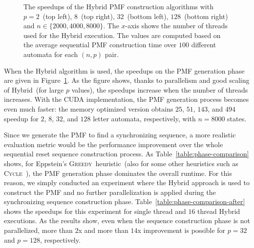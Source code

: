 \documentclass[12pt]{article}
\newcommand{\kkcomm}[1]{{\color{red}{\bf kk: #1}}}
\newcommand{\greedyAlgo}{\textsc{Greedy}}
\begin{document}
\begin{figure}[ht]
{	}
	\caption{The speedups of the Hybrid PMF construction algorithms with $p = 2$~(top left), $8$~(top right), $32$~(bottom left), $128$~(bottom right) and $n \in \{2000, 4000, 8000\}$. The $x$-axis shows the number of threads used for the Hybrid execution.  The values are computed based on the average sequential PMF construction time over $100$ different automata for each $(n, p)$ pair.\kkcomm{bu figureleri acalim yatay olarak, rakamlar sigmamis. ya da iki haneli speeduplar elde edelim bundan sonra... cok speedup olunca basa bela oluyor boyle.}}
	\label{fig:hybrid-speedup}
\end{figure}

When the Hybrid algorithm is used, the speedups on the PMF generation phase are given in Figure~\ref{fig:hybrid-speedup}. As the figure shows, thanks to parallelism and good scaling of Hybrid~(for large $p$ values), the speedups increase when the number of threads increases. With the CUDA implementation, the PMF generation process becomes even much faster: the memory optimized version obtains $25$, $51$, $143$, and $494$ speedup for $2$, $8$, $32$, and $128$ letter automata, respectively, with $n = 8000$ states. 

Since we generate the PMF to find a synchronizing sequence, a more realistic evaluation metric would be the performance improvement over the whole sequential reset sequence construction process. As Table~\ref{table:phase-comparison} shows, for Eppstein's \greedyAlgo\ heuristic~(also for some other heuristics such as \textsc{Cycle}~\cite{Trahtman04}), the PMF generation phase dominates the overall runtime. For this reason, we simply conducted an experiment where the Hybrid approach is used to construct the PMF and no further parallelization is applied during the synchronizing sequence construction phase. Table~\ref{table:phase-comparison-after} shows the speedups for this experiment for single thread and $16$ thread Hybrid executions. As the results show, even when the sequence construction phase is not parallelized, more than $2$x and more than $14$x improvement is possible for $p = 32$ and $p = 128$, respectively.\kkcomm{bunu anlamadim, aciklayabilir miyiz? bu 2 ve 14 nereden geldi?}
\end{document}
